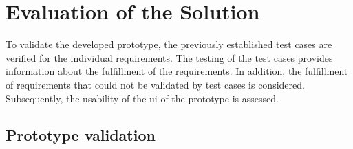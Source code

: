 \section{Evaluation of the Solution}

To validate the developed prototype, the previously established test cases are verified for the individual requirements. The testing of the test cases provides information about the fulfillment of the requirements. In addition, the fulfillment of requirements that could not be validated by test cases is considered. Subsequently, the usability of the \ac{ui} of the prototype is assessed.

\subsection{Prototype validation}

